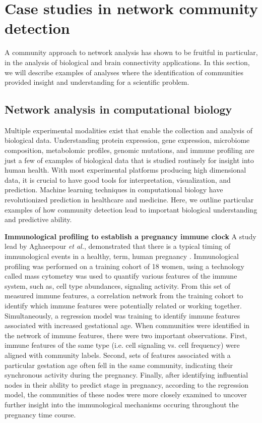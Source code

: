 \section{Case studies in network community detection}
 A community approach to network analysis has shown to be fruitful in particular, in the analysis of biological and brain connectivity applications. In this section, we will describe examples of analyses where the identification of communities provided insight and understanding for a scientific problem. 
\subsection{Network analysis in computational biology}
Multiple experimental modalities exist that enable the collection and analysis of biological data. Understanding protein expression, gene expression, microbiome composition, metabolomic profiles, genomic mutations, and immune profiling are just a few of examples of biological data that is studied routinely for insight into human health. With most experimental platforms producing high dimensional data, it is crucial to have good tools for interpretation, visualization, and prediction. Machine learning techniques in computational biology have revolutionized prediction in healthcare and medicine. Here, we outline particular examples of how community detection lead to important biological understanding and predictive ability.

{\bf Immunological profiling to establish a pregnancy immune clock}
A study lead by Aghaeepour \emph{et al.}, demonstrated that there is a typical timing of immunological events in a healthy, term, human pregnancy \cite{immuneClock}. Immunological profiling was performed on a training cohort of 18 women, using a technology called mass cytometry \cite{cytof} was used to quantify various features of the immune system, such as, cell type abundances, signaling activity. From this set of measured immune features, a correlation network from the training cohort to identify which immune features were potentially related or working together. Simultaneously, a regression model was training to identify immune features associated with increased gestational age. When communities were identified in the network of immune features, there were two important observations. First, immune features of the same type (i.e. cell signaling vs. cell frequency) were aligned with community labels. Second, sets of features associated with a particular gestation age often fell in the same community, indicating their synchronous activity during the pregnancy. Finally, after identifying influential nodes in their ability to predict stage in pregnancy, according to the regression model, the communities of these nodes were more closely examined to uncover further insight into the immunological mechanisms occuring throughout the pregnancy time course. 



